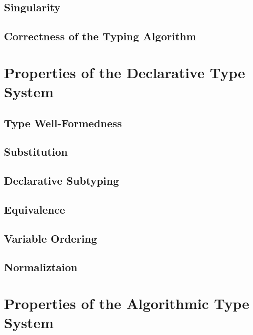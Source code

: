 \documentclass[acmsmall,natbib=false,review,anonymous]{acmart}
\newcommand{\genDir}{_gen}
\begin{document}
\subsection{Singularity}


\subsection{Correctness of the Typing Algorithm}




\section{Properties of the Declarative Type System}

\subsection{Type Well-Formedness}


\subsection{Substitution}


\subsection{Declarative Subtyping}


\subsection{Equivalence}
\label{sec:decl-equiv-lemmas}


\subsection{Variable Ordering}


\subsection{Normaliztaion}



\section{Properties of the Algorithmic Type System}
\end{document}
